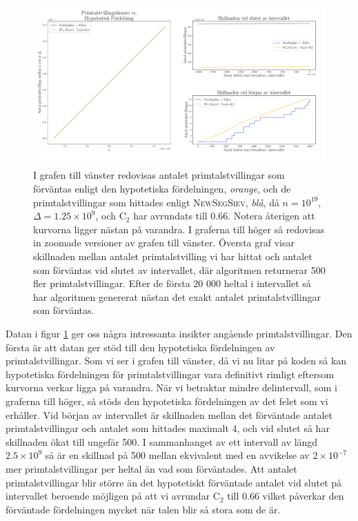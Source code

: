 \begin{figure}[H]
    \centering
    \includegraphics[width = \textwidth]{coen/Images/TwinPrimesNoKapp.pdf}
    \caption{I grafen till vänster redovisas antalet primtalstvillingar som förväntas enligt den hypotetiska fördelningen, \textit{orange}, och de primtalstvillingar som hittades enligt \textsc{NewSegSiev}, \textit{blå}, då \(n = 10^{19}\), \(\Delta = 1.25\times10^9\), och \(\text{C}_2\) har avrundats till 0.66. Notera återigen att kurvorna ligger nästan på varandra. I graferna till höger så redovisas in zoomade versioner av grafen till vänster. Översta graf visar skillnaden mellan antalet primtalstvilling vi har hittat och antalet som förväntas vid slutet av intervallet, där algoritmen returnerar 500 fler primtalstvillingar. Efter de första 20 000 heltal i intervallet så har algoritmen genererat nästan det exakt antalet primtalstvillingar som förväntas.}
    \label{fig:res.twins}
\end{figure}

Datan i figur \ref{fig:res.twins} ger oss några intressanta insikter angående primtalstvillingar. 
Den första är att datan ger stöd till den hypotetiska fördelningen av primtalstvillingar. 
Som vi ser i grafen till vänster, då vi nu litar på koden så kan hypotetiska fördelningen för primtalstvillingar vara definitivt rimligt eftersom kurvorna verkar ligga på varandra.
När vi betraktar mindre delintervall, som i graferna till höger, så stöds den hypotetiska fördelningen av det felet som vi erhåller. 
Vid början av intervallet är skillnaden mellan det förväntade antalet primtalstvillingar och antalet som hittades maximalt 4, och vid slutet så har skillnaden ökat till ungefär 500.
I sammanhanget av ett intervall av längd \(2.5\times10^9\) så är en skillnad på 500 mellan ekvivalent med en avvikelse av \(2\times 10^{-7}\) mer primtalstvillingar per heltal än vad som förväntades.
Att antalet primtalstvillingar blir större än det hypotetiskt förväntade antalet vid slutet på intervallet beroende möjligen på att vi avrundar \(\text{C}_2\) till 0.66 vilket påverkar den förväntade fördelningen mycket när talen blir så stora som de är.

